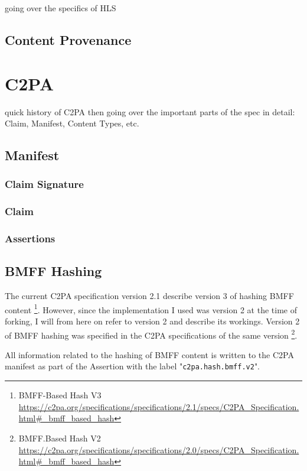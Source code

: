 going over the specifics of HLS

\subsection{Content Provenance\label{sec:conpro}}

\section{C2PA\label{c2pa}}

quick history of C2PA then going over the important parts of the spec in detail: Claim, Manifest, Content Types, etc.

\subsection{Manifest}

\subsubsection{Claim Signature}

\subsubsection{Claim}

\subsubsection{Assertions}

\subsection{BMFF Hashing}

The current C2PA specification version 2.1 describe version 3 of hashing BMFF content \footnote{BMFF-Based Hash V3 \url{https://c2pa.org/specifications/specifications/2.1/specs/C2PA_Specification.html\#_bmff_based_hash}}. However, since the implementation I used was version 2 at the time of forking, I will from here on refer to version 2 and describe its workings. Version 2 of BMFF hashing was specified in the C2PA specifications of the same version \footnote{BMFF.Based Hash V2 \url{https://c2pa.org/specifications/specifications/2.0/specs/C2PA_Specification.html\#_bmff_based_hash}}.

All information related to the hashing of BMFF content is written to the C2PA manifest as part of the Assertion with the label "\texttt{c2pa.hash.bmff.v2}".

